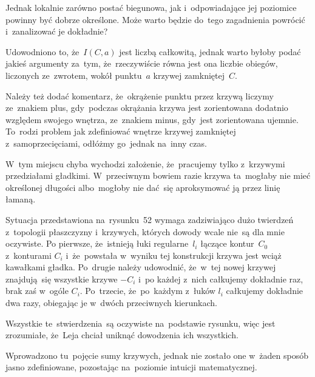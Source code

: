 \documentclass[a4paper,11pt]{article}
\numberwithin{equation}{section}
\begin{document}
Jednak lokalnie zarówno postać biegunowa, jak i~odpowiadające jej
poziomice powinny być dobrze określone. Może warto będzie do~tego
zagadnienia powrócić i~zanalizować je dokładnie?

\VerSpaceFour





\noindent
{} Udowodniono to, że~$I( C, a )$ jest liczbą całkowitą, jednak
warto byłoby podać jakieś argumenty za~tym, że~rzeczywiście równa jest ona
liczbie obiegów, liczonych ze~zwrotem, wokół punktu~$a$ krzywej
zamkniętej~$C$.

Należy też dodać komentarz, że~okrążenie punktu przez krzywą liczymy
ze~znakiem plus, gdy~podczas okrążania krzywa jest zorientowana
dodatnio względem swojego wnętrza, ze~znakiem minus, gdy~jest
zorientowana ujemnie. To~rodzi problem jak zdefiniować wnętrze
krzywej zamkniętej z~samoprzecięciami, odłóżmy go~jednak na~inny czas.

\VerSpaceFour





\noindent
{} W~tym miejscu chyba wychodzi założenie, że~pracujemy tylko
z~krzywymi przedziałami gładkimi. W~przeciwnym bowiem razie krzywa
ta~mogłaby nie mieć określonej długości albo~mogłoby nie dać~się
aproksymować ją przez linię łamaną.

\VerSpaceFour





\noindent
{} Sytuacja przedstawiona na~rysunku~52 wymaga zadziwiająco dużo
twierdzeń z~topologii płaszczyzny i~krzywych, których dowody wcale nie~są
dla mnie oczywiste. Po pierwsze, że~istnieją łuki regularne~$l_{ i }$
łączące kontur~$C_{ 0 }$ z~konturami $C_{ i }$ i~że~powstała w~wyniku tej
konstrukcji krzywa jest wciąż kawałkami gładka. Po~drugie należy udowodnić,
że~w~tej nowej krzywej znajdują~się wszystkie krzywe $-C_{ i }$ i~po każdej
z~nich całkujemy dokładnie raz, brak zaś w~ogóle $C_{ i }$. Po~trzecie,
że~po~każdym z~łuków $l_{ i }$ całkujemy dokładnie dwa razy, obiegając je
w~dwóch przeciwnych kierunkach.

Wszystkie te~stwierdzenia~są oczywiste na~podstawie rysunku, więc
jest zrozumiałe, że~Leja chciał uniknąć dowodzenia ich wszystkich.

\VerSpaceFour





\noindent
{} Wprowadzono tu~pojęcie sumy krzywych, jednak nie zostało one
w~żaden sposób jasno zdefiniowane, pozostając na~poziomie intuicji
matematycznej.
\end{document}
